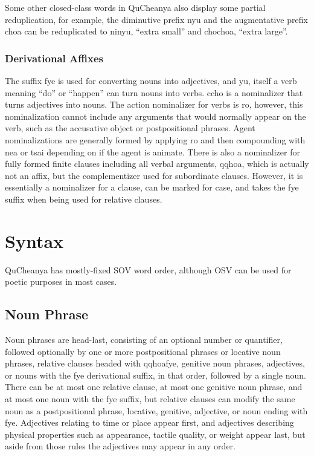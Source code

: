 \documentclass{article}
\begin{document}
Some other closed-class words in QuCheanya also display some partial reduplication, for example, the diminutive prefix {\quch nyu} and the augmentative prefix {\quch choa} can be reduplicated to {\quch ninyu}, ``extra small'' and {\quch chochoa}, ``extra large''.

\subsubsection{Derivational Affixes}

The suffix {\quch fye} is used for converting nouns into adjectives, and {\quch yu}, itself a verb meaning ``do'' or ``happen'' can turn nouns into verbs. {\quch ccho} is a nominalizer that turns adjectives into nouns. The action nominalizer for verbs is {\quch ro}, however, this nominalization cannot include any arguments that would normally appear on the verb, such as the accusative object or postpositional phrases.  Agent nominalizations are generally formed by applying {\quch ro} and then compounding with {\quch nea} or {\quch tsai} depending on if the agent is animate.  There is also a nominalizer for fully formed finite clauses including all verbal arguments, {\quch qqhoa}, which is actually not an affix, but the complementizer used for subordinate clauses. However, it is essentially a nominalizer for a clause, can be marked for case, and takes the {\quch fye} suffix when being used for relative clauses.

\section{Syntax}

QuCheanya has mostly-fixed SOV word order, although OSV can be used for poetic purposes in most cases.

\subsection{Noun Phrase}

Noun phrases are head-last, consisting of an optional number or quantifier, followed optionally by one or more postpositional phrases or locative noun phrases, relative clauses headed with {\quch qqhoafye}, genitive noun phrases, adjectives, or nouns with the {\quch fye} derivational suffix, in that order, followed by a single noun.  There can be at most one relative clause, at most one genitive noun phrase, and at most one noun with the {\quch fye} suffix, but relative clauses can modify the same noun as a postpositional phrase, locative, genitive, adjective, or noun ending with {\quch fye}.  Adjectives relating to time or place appear first, and adjectives describing physical properties such as appearance, tactile quality, or weight appear last, but aside from those rules the adjectives may appear in any order.
\end{document}
